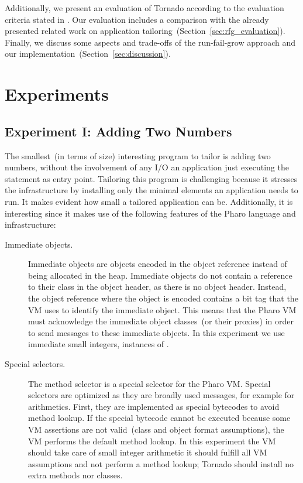 Additionally, we present an evaluation of Tornado according to the evaluation criteria stated in . Our evaluation includes a comparison with the already presented related work on application tailoring~(Section~\ref{sec:rfg_evaluation}).
Finally, we discuss some aspects and trade-offs of the run-fail-grow approach and our implementation~(Section~\ref{sec:discussion}).

\section{Experiments}\label{sec:rfg_experiments}

\subsection*{Experiment I: Adding Two Numbers}

The smallest~(in terms of size) interesting program to tailor is adding two numbers, without the involvement of any I/O \ie an application just executing the  statement as entry point. Tailoring this program is challenging because it stresses the infrastructure by installing only the minimal elements an application needs to run. It makes evident how small a tailored application can be. Additionally, it is interesting since it makes use of the following features of the Pharo language and infrastructure:

\begin{description}
\item[Immediate objects.] Immediate objects are objects encoded in the object reference instead of being allocated in the heap. Immediate objects do not contain a reference to their class in the object header, as there is no object header. Instead, the object reference where the object is encoded contains a bit tag that the VM uses to identify the immediate object. This means that the Pharo VM must acknowledge the immediate object classes~(or their proxies) in order to send messages to these immediate objects. In this experiment we use immediate small integers, instances of .
\item[Special selectors.] The method selector \ct{+} is a special selector for the Pharo VM. Special selectors are optimized as they are broadly used messages, for example for arithmetics. First, they are implemented as special bytecodes to avoid method lookup. If the special bytecode cannot be executed because some VM assertions are not valid~(\eg class and object format assumptions), the VM performs the default method lookup. In this experiment the VM should take care of small integer arithmetic \ie it should fulfill all VM assumptions and not perform a method lookup; Tornado should install no extra methods nor classes.
\end{description}

